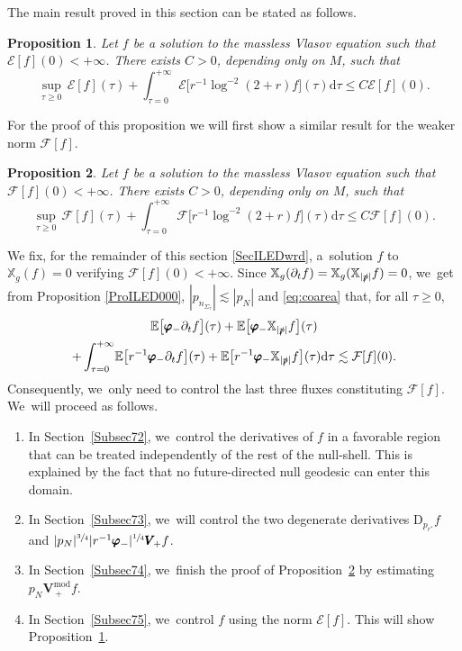 \documentclass[JEP,XML,SOM,Unicode,published]{cedram}
\theoremstyle{plain}
\newtheorem{proposition}{Proposition}[section]
\theoremstyle{definition}
\newcommand\T{{\mathbb{X}}}
\newcommand\dr{{\mathrm{d}}}
\begin{document}
The main result proved in this section can be stated as follows.

\begin{proposition}\label{ProILEDwrd2}
Let $f $ be a solution to the massless Vlasov equation such that $\mathcal{E}[f](0) <+ \infty$. There exists $C>0$, depending only on $M$, such that
\[
\sup_{\tau \geq 0} \, \mathcal{E}[f](\tau) +\int_{\tau=0}^{+\infty} \mathcal{E}\bigl[r^{-1}\log^{-2}(2+r)f \bigr](\tau) \dr \tau \leq C \mathcal{E}[f](0).
\]
\end{proposition}

For the proof of this proposition we will first show a similar result for the weaker norm $\mathcal{F}[f]$.

\begin{proposition}\label{ProILEDwrd}
Let $f $ be a solution to the massless Vlasov equation such that $\mathcal{F}[f](0) <+ \infty$. There exists $C>0$, depending only on $M$, such that
\[
\sup_{\tau \geq 0} \, \mathcal{F}[f](\tau) +\int_{\tau=0}^{+\infty} \mathcal{F}\bigl[r^{-1}\log^{-2}(2+r)f \bigr](\tau) \dr \tau \leq C \mathcal{F}[f](0).
\]
\end{proposition}

We fix, for the remainder of this section \ref{SecILEDwrd}, a~solution $f$ to $\T_g(f)=0$ verifying $\mathcal{F}[f](0)<+\infty$. Since $\T_g(\partial_t f)=\T_g(\T_{|\slashed{p}|}f)=0$, we~get from Proposition \ref{ProILED000}, $|p_{n_{\Sigma_\tau}}| \lesssim |p_N|$ and \eqref{eq:coarea} that, for all $\tau \geq 0$,
\begin{multline}\label{kevatalenn:0}
\mathbb{E}\bigl[ \pmb{\varphi}_- \partial_t f \bigr](\tau)+\mathbb{E}\bigl[ \pmb{\varphi}_- \T_{|\slashed{p}|} f \bigr](\tau) \\
+ \int_{\tau=0}^{+\infty} \! \mathbb{E}\bigl[ r^{-1} \pmb{\varphi}_- \partial_t f \bigr](\tau)+\mathbb{E}\bigl[r^{-1} \pmb{\varphi}_- \T_{|\slashed{p}|} f \bigr](\tau) \dr \tau \lesssim \mathcal{F}[f](0).
\end{multline}
Consequently, we~only need to control the last three fluxes constituting $\mathcal{F}[f]$. We~will proceed as follows.
\begin{enumerate}
\item In Section~\ref{Subsec72}, we~control the derivatives of $f$ in a favorable region that can be treated independently of the rest of the null-shell. This is explained by the fact that no future-directed null geodesic can enter this domain.
\item In Section~\ref{Subsec73}, we~will control the two degenerate derivatives $\mathrm{D}_{p_{r^*}} f$ and $ |p_N|^{\sfrac{3}{4}} |r^{-1} \pmb{\varphi}_-|^{\sfrac{1}{4}} \pmb{V}_{\! +} f$.
\item In Section~\ref{Subsec74}, we~finish the proof of Proposition~\ref{ProILEDwrd} by estimating $p_N\pmb{V}_{\, +}^{\mathrm{mod}}f$.
\item In Section~\ref{Subsec75}, we~control $f$ using the norm $\mathcal{E}[f]$. This will show Proposition~\ref{ProILEDwrd2}.
\end{enumerate}
\end{document}
